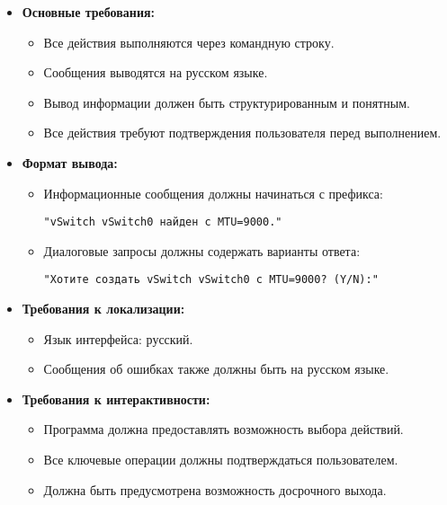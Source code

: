 \begin{itemize}
    \item \textbf{Основные требования:}
    \begin{itemize}
        \item Все действия выполняются через командную строку.
        \item Сообщения выводятся на русском языке.
        \item Вывод информации должен быть структурированным и понятным.
        \item Все действия требуют подтверждения пользователя перед выполнением.
    \end{itemize}
    
    \item \textbf{Формат вывода:}
    \begin{itemize}
        \item Информационные сообщения должны начинаться с префикса:
        \begin{lstlisting}
"vSwitch vSwitch0 найден с MTU=9000."
        \end{lstlisting}
        \item Диалоговые запросы должны содержать варианты ответа:
        \begin{lstlisting}
"Хотите создать vSwitch vSwitch0 с MTU=9000? (Y/N):"
        \end{lstlisting}
    \end{itemize}
    
    \item \textbf{Требования к локализации:}
    \begin{itemize}
        \item Язык интерфейса: русский.
        \item Сообщения об ошибках также должны быть на русском языке.
    \end{itemize}
    
    \item \textbf{Требования к интерактивности:}
    \begin{itemize}
        \item Программа должна предоставлять возможность выбора действий.
        \item Все ключевые операции должны подтверждаться пользователем.
        \item Должна быть предусмотрена возможность досрочного выхода.
    \end{itemize}
\end{itemize}

